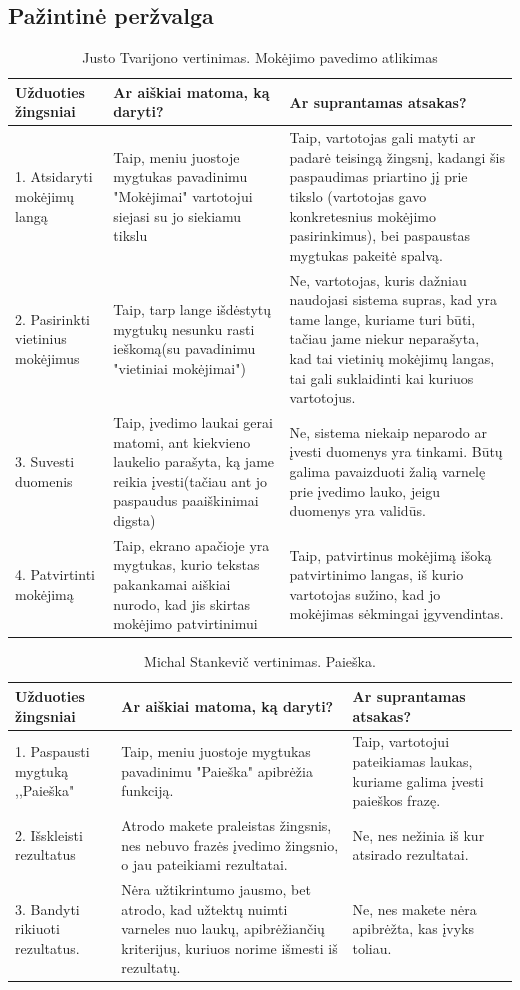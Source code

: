 \documentclass[oneside]{VUMIFPSkursinis}
\begin{document}
\subsection{Pažintinė peržvalga}

\begin{center}
\begin{longtable}[!htb]{|p{5cm}|p{5cm}|p{5cm}|}
	\caption{Justo Tvarijono vertinimas. Mokėjimo pavedimo atlikimas}
\endfirsthead
\endhead
	\hline
	Užduoties žingsniai & Ar aiškiai matoma, ką daryti? & Ar suprantamas atsakas? \\ \hline
	1. Atsidaryti mokėjimų langą & Taip, meniu juostoje mygtukas pavadinimu "Mokėjimai" vartotojui siejasi su jo siekiamu tikslu & Taip, vartotojas gali matyti ar padarė teisingą žingsnį, kadangi šis paspaudimas priartino jį prie tikslo (vartotojas gavo konkretesnius mokėjimo pasirinkimus), bei paspaustas mygtukas pakeitė spalvą. \\ \hline
	2. Pasirinkti vietinius mokėjimus & Taip, tarp lange išdėstytų mygtukų nesunku rasti ieškomą(su pavadinimu "vietiniai mokėjimai") & Ne, vartotojas, kuris dažniau naudojasi sistema supras, kad yra tame lange, kuriame turi būti, tačiau jame niekur neparašyta, kad tai vietinių mokėjimų langas, tai gali suklaidinti kai kuriuos vartotojus. \\ \hline
	3. Suvesti duomenis & Taip, įvedimo laukai gerai matomi, ant kiekvieno laukelio parašyta, ką jame reikia įvesti(tačiau ant jo paspaudus paaiškinimai digsta) & Ne, sistema niekaip neparodo ar įvesti duomenys yra tinkami. Būtų galima pavaizduoti žalią varnelę prie įvedimo lauko, jeigu duomenys yra validūs. \\ \hline
	4. Patvirtinti mokėjimą & Taip, ekrano apačioje yra mygtukas, kurio tekstas pakankamai aiškiai nurodo, kad jis skirtas mokėjimo patvirtinimui & Taip, patvirtinus mokėjimą išoką patvirtinimo langas, iš kurio vartotojas sužino, kad jo mokėjimas sėkmingai įgyvendintas. \\ \hline
\end{longtable}
\begin{longtable}[!htb]{|p{5cm}|p{5cm}|p{5cm}|}
	\caption{Michal Stankevič vertinimas. Paieška.}
\endfirsthead
\endhead
	\hline
	Užduoties žingsniai & Ar aiškiai matoma, ką daryti? & Ar suprantamas atsakas? \\ \hline
	1. Paspausti mygtuką ,,Paieška" & Taip, meniu juostoje mygtukas pavadinimu "Paieška" apibrėžia funkciją. & Taip, vartotojui pateikiamas laukas, kuriame galima įvesti paieškos frazę. \\ \hline
	2. Išskleisti rezultatus & Atrodo makete praleistas žingsnis, nes nebuvo frazės įvedimo žingsnio, o jau pateikiami rezultatai. & Ne, nes nežinia iš kur atsirado rezultatai.\\ \hline
	3. Bandyti rikiuoti rezultatus. & Nėra užtikrintumo jausmo, bet atrodo, kad užtektų nuimti varneles nuo laukų, apibrėžiančių kriterijus, kuriuos norime išmesti iš rezultatų. & Ne, nes makete nėra apibrėžta, kas įvyks toliau. \\ \hline
\end{longtable}
\end{center}
\end{document}
